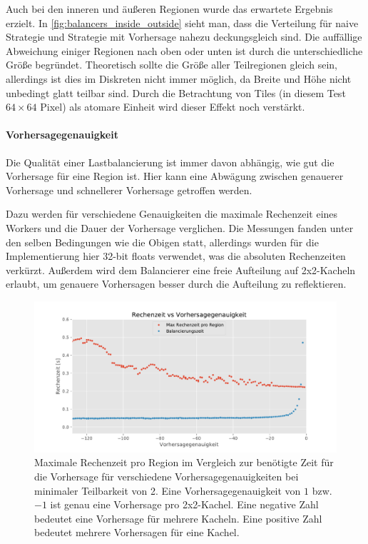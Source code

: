 Auch bei den inneren und äußeren Regionen wurde das erwartete Ergebnis erzielt.
In \autoref{fig:balancers_inside_outside} sieht man, dass die Verteilung für naive Strategie und Strategie mit Vorhersage nahezu deckungsgleich sind.
Die auffällige Abweichung einiger Regionen nach oben oder unten ist durch die unterschiedliche Größe begründet.
Theoretisch sollte die Größe aller Teilregionen gleich sein, allerdings ist dies im Diskreten nicht immer möglich, da Breite und Höhe nicht unbedingt glatt teilbar sind.
Durch die Betrachtung von Tiles (in diesem Test $64\times64$ Pixel) als atomare Einheit wird dieser Effekt noch verstärkt.

\paragraph{Vorhersagegenauigkeit}

Die Qualität einer Lastbalancierung ist immer davon abhängig, wie gut die Vorhersage für eine Region ist.
Hier kann eine Abwägung zwischen genauerer Vorhersage und schnellerer Vorhersage getroffen werden.

Dazu werden für verschiedene Genauigkeiten die maximale Rechenzeit eines Workers und die Dauer der Vorhersage verglichen.
Die Messungen fanden unter den selben Bedingungen wie die Obigen statt, allerdings wurden für die Implementierung hier 32-bit floats verwendet, was die absoluten Rechenzeiten verkürzt.
Außerdem wird dem Balancierer eine freie Aufteilung auf 2x2-Kacheln erlaubt, um genauere Vorhersagen besser durch die Aufteilung zu reflektieren.

\begin{figure}
	\centering
	\includegraphics[width=0.9\linewidth]{img/Evaluation/prediction_accuracy_tile2_cropped.pdf}
	\caption{Maximale Rechenzeit pro Region im Vergleich zur benötigte Zeit für die Vorhersage für verschiedene Vorhersagegenauigkeiten bei minimaler Teilbarkeit von 2.
		Eine Vorhersagegenauigkeit von $1$ bzw. $-1$ ist genau eine Vorhersage pro 2x2-Kachel. Eine negative Zahl bedeutet eine Vorhersage für mehrere Kacheln. Eine positive Zahl bedeutet mehrere Vorhersagen für eine Kachel.}
	\label{fig:balancers_prediction_accuracy}
\end{figure}

